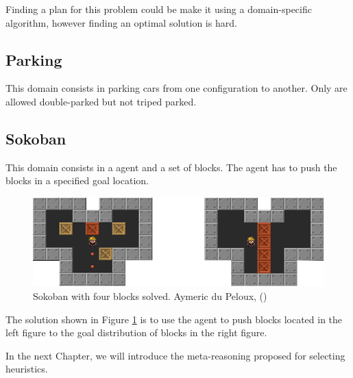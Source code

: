 Finding a plan for this problem could be make it using a domain-specific algorithm, however finding an optimal solution is hard.

\subsection{Parking}
This domain consists in parking cars from one configuration to another. Only are allowed double-parked but not triped parked.

\subsection{Sokoban}
This domain consists in a agent and a set of blocks. The agent has to push the blocks in a specified goal location.

\begin{figure}[!htb]
\begin{center}
  \includegraphics[width=12cm,scale=0.5]{images/sokoban_star_end}
\end{center}
\caption{Sokoban with four blocks solved. Aymeric du Peloux, (\citeyear{sokoban2010})}\label{fig:img_sokoban_solved}
\end{figure}

The solution shown in Figure \ref{fig:img_sokoban_solved} is to use the agent to push blocks located in the left figure to the goal distribution of blocks in the right figure.

\bigskip

In the next Chapter, we will introduce the meta-reasoning proposed for selecting heuristics.

\clearpage